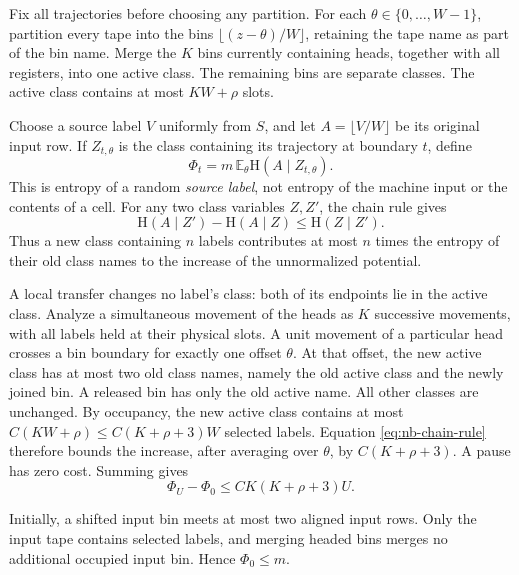 \begin{informalproof}
Fix all trajectories before choosing any partition.  For each
$\theta\in\{0,\ldots,W-1\}$, partition every tape into the bins
$\lfloor(z-\theta)/W\rfloor$, retaining the tape name as part of the
bin name.  Merge the $K$ bins currently containing heads, together
with all registers, into one active class.  The remaining bins are
separate classes.  The active class contains at most $KW+\rho$ slots.

Choose a source label $V$ uniformly from $S$, and let
$A=\lfloor V/W\rfloor$ be its original input row.  If
$Z_{t,\theta}$ is the class containing its trajectory at boundary $t$,
define
\[
 \Phi_t=m\,\mathbb E_\theta\mathrm H(A\mid Z_{t,\theta}).
\]
This is entropy of a random \emph{source label}, not entropy of the
machine input or the contents of a cell.  For any two class variables
$Z,Z'$, the chain rule gives
\begin{equation}\label{eq:nb-chain-rule}
 \mathrm H(A\mid Z')-\mathrm H(A\mid Z)
       \le \mathrm H(Z\mid Z').
\end{equation}
Thus a new class containing $n$ labels contributes at most $n$ times
the entropy of their old class names to the increase of the unnormalized
potential.

A local transfer changes no label's class: both of its endpoints lie
in the active class.  Analyze a simultaneous movement of the heads as
$K$ successive movements, with all labels held at their physical slots.
A unit movement of a particular head crosses a bin boundary for exactly
one offset $\theta$.  At that offset, the new active class has at most
two old class names, namely the old active class and the newly joined
bin.  A released bin has only the old active name.  All other classes
are unchanged.  By occupancy, the new active class contains at most
$C(KW+\rho)\le C(K+\rho+3)W$ selected labels.  Equation
\eqref{eq:nb-chain-rule} therefore bounds the increase, after averaging
over $\theta$, by $C(K+\rho+3)$.  A pause has zero cost.  Summing gives
\begin{equation}\label{eq:nb-potential-motion}
 \Phi_U-\Phi_0\le CK(K+\rho+3)U.
\end{equation}

Initially, a shifted input bin meets at most two aligned input rows.
Only the input tape contains selected labels, and merging headed bins
merges no additional occupied input bin.  Hence $\Phi_0\le m$.


\end{informalproof}
